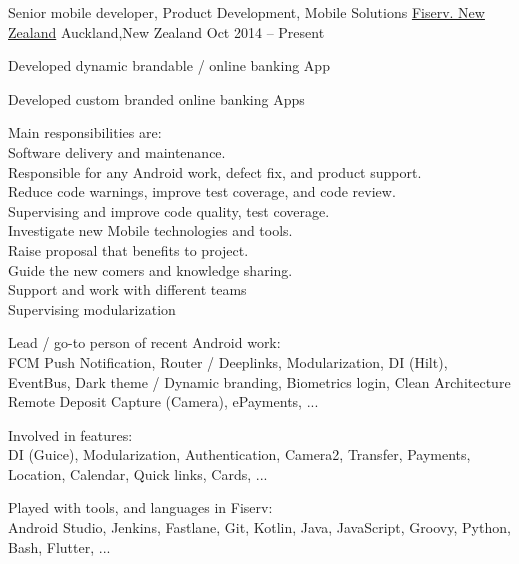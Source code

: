 
\begin{cventries}
	\cventry
	{Senior mobile developer, Product Development, Mobile Solutions}
	{\href{https://www.careers.fiserv.com/new-zealand}{Fiserv. New Zealand}}
	{Auckland,\enskip New Zealand}
	{Oct 2014 – Present}
	{
		\begin{cvitems}
			\item {Developed dynamic brandable \href{https://play.google.com/store/apps/details?id=com.fiserv.touchbankingasp&hl=en}{\color{deepblue}{Android}}/\href{https://itunes.apple.com/us/app/touchbanking/id386678211?mt=8}{\color{deepblue}{iPhone}} online banking App}
			\item {Developed custom branded online banking Apps}
			\item 
			{Main responsibilities are: 
				\\\tab * Software delivery and maintenance.
				\\\tab * Responsible for any Android work, defect fix, and product support.
				\\\tab * Reduce code warnings, improve test coverage, and code review.
				\\\tab * Supervising and improve code quality, test coverage.
				\\\tab * Investigate new Mobile technologies and tools.
				\\\tab * Raise proposal that benefits to project.
				\\\tab * Guide the new comers and knowledge sharing.
				\\\tab * Support and work with different teams
				\\\tab * Supervising modularization
			}
			\item {Lead / go-to person of recent Android work: 
				\\\tab FCM Push Notification, Router / Deeplinks, Modularization, DI (Hilt), EventBus, Dark theme / Dynamic branding, Biometrics login, Clean Architecture
				\\\tab Remote Deposit Capture (Camera), ePayments, ...}
			\item {Involved in features: 
				\\\tab DI (Guice), Modularization, Authentication, Camera2, Transfer, Payments, Location, Calendar, Quick links, Cards, ...}
			\item {Played with tools, and languages in Fiserv: 
				\\\tab Android Studio, Jenkins, Fastlane, Git, Kotlin, Java, JavaScript, Groovy, Python, Bash, Flutter, ...}
		\end{cvitems}
	}
\end{cventries}

